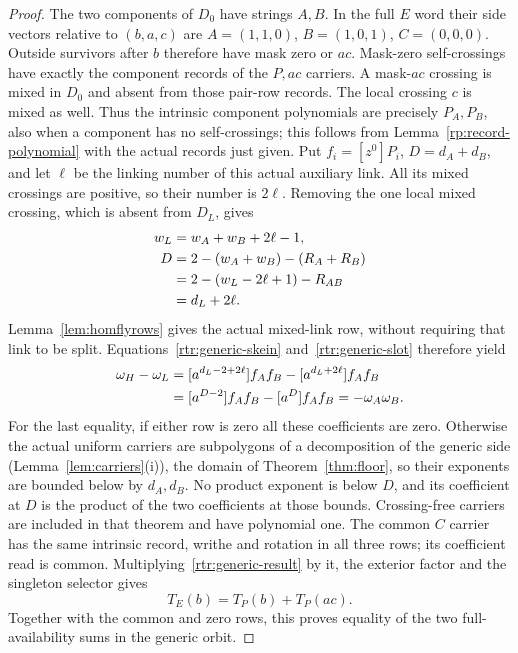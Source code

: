 \begin{proof}
The two components of $D_0$ have strings $A,B$. In the full $E$
word their side vectors relative to $(b,a,c)$ are
$A=(1,1,0)$, $B=(1,0,1)$, $C=(0,0,0)$.
Outside survivors after $b$ therefore have mask zero or $ac$.
Mask-zero self-crossings have exactly the component records of the
$P,ac$ carriers. A mask-$ac$ crossing is mixed in $D_0$ and absent
from those pair-row records. The local crossing $c$ is mixed as well.
Thus the intrinsic component polynomials are precisely $P_A,P_B$,
also when a component has no self-crossings; this follows from
Lemma~\ref{rp:record-polynomial} with the actual records just given.
Put $f_i=[z^0]P_i$, $D=d_A+d_B$, and let $\ell$ be the linking
number of this actual auxiliary link. All its mixed crossings are
positive, so their number is $2\ell$. Removing the one local mixed
crossing, which is absent from $D_L$, gives
\begin{align}
 w_L&=w_A+w_B+2\ell-1,\notag\\
 D&=2-(w_A+w_B)-(R_A+R_B)\notag\\
  &=2-(w_L-2\ell+1)-R_{AB}\notag\\
  &=d_L+2\ell.\label{rtr:generic-slot}
\end{align}
Lemma~\ref{lem:homflyrows} gives the actual mixed-link row, without
requiring that link to be split. Equations~\eqref{rtr:generic-skein}
and~\eqref{rtr:generic-slot} therefore yield
\begin{align}
 \omega_H-\omega_L
 &= [a^{d_L-2+2\ell}]f_Af_B
       -[a^{d_L+2\ell}]f_Af_B\notag\\
 &= [a^{D-2}]f_Af_B-[a^D]f_Af_B
  =-\omega_A\omega_B.\label{rtr:generic-result}
\end{align}
For the last equality, if either row is zero all these coefficients
are zero. Otherwise the actual uniform carriers are subpolygons of a
decomposition of the generic side (Lemma~\ref{lem:carriers}(i)), the
domain of Theorem~\ref{thm:floor}, so their exponents are bounded below by
$d_A,d_B$. No product exponent is below $D$, and its coefficient at
$D$ is the product of the two coefficients at those bounds.
Crossing-free carriers are included in that theorem and have
polynomial one. The common $C$ carrier has the same intrinsic record,
writhe and rotation in all three rows; its coefficient read is common.
Multiplying~\eqref{rtr:generic-result} by it, the exterior factor and
the singleton selector gives
\begin{equation}\label{rtr:generic-couple}
 T_E(b)=T_P(b)+T_P(ac).
\end{equation}
Together with the common and zero rows, this proves equality of the
two full-availability sums in the generic orbit.


\end{proof}
